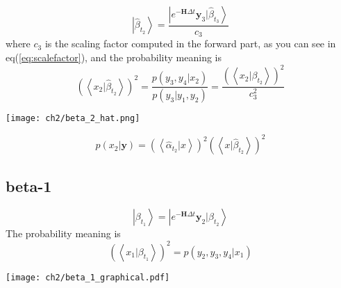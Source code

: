 \begin{definition}
\begin{equation}
        \left|\hat{\beta}_{t_2}  \right> =  \frac{\left| e^{-\textbf{H}\Delta t} \textbf{y}_3 |\hat{\beta}_{t_3} \right>}{c_3}
\end{equation}
where $c_3$ is the scaling factor computed in the forward part, as you can see in eq(\ref{eq:scalefactor}), and 
the probability meaning is
\begin{equation}
        \left(\left<x_2|\hat{\beta}_{t_{2}} \right>\right)^2 = \frac{p(y_3, y_4|x_2)}{p(y_3|y_1,y_2)} 
        =  \frac{ (\left<x_2|\beta_{t_{2}} \right>)^2 }{ c_3^2 }
\end{equation}
\begin{center}
        \texttt{[image: ch2/beta\_2\_hat.png]}
\end{center}
\begin{equation}
        p(x_2|\textbf{y}) = (\left<\hat{\alpha}_{t_{2}}|x \right>)^2 \left(\left<x|\hat{\beta}_{t_{2}} \right>\right)^2
\end{equation} 
\end{definition}

\subsection{beta-1}
\begin{definition}
\begin{equation}
        \left|\beta_{t_1}  \right> =  \left| e^{-\textbf{H}\Delta t} \textbf{y}_2 |\beta_{t_2} \right>
\end{equation}
The probability meaning is
\begin{equation}
           \left( \left<x_1 |\beta_{t_1}  \right> \right)^2 = p(y_2, y_3, y_4 | x_1)
\end{equation}
\begin{center}
        \texttt{[image: ch2/beta\_1\_graphical.pdf]}
\end{center}       
\end{definition}


